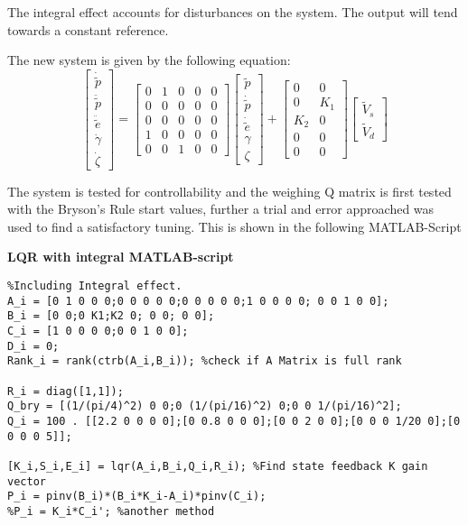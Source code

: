 The integral effect accounts for disturbances on the system. The output will tend towards a constant reference.

The new system is given by the following equation:
\begin{equation} \label{eq:LQR}
      \begin{bmatrix}
        \dot{\tilde{p}} \\
        \ddot{\tilde{p}} \\
        \ddot{\tilde{e}}\\
          \dot{\gamma} \\
        \dot{\zeta}
    \end{bmatrix}
    =
     \begin{bmatrix}
    0 & 1 & 0 & 0 & 0\\
    0 & 0 & 0 & 0 & 0 \\
    0 & 0 & 0 & 0 & 0 \\
    1 & 0 & 0 & 0 & 0 \\
    0 & 0 & 1 & 0 & 0
    \end{bmatrix}
    \begin{bmatrix}
        \tilde{p} \\
        \dot{\tilde{p}} \\
        \dot{\tilde{e}}\\
        \gamma\\
        \zeta
    \end{bmatrix}
    + %
       \begin{bmatrix}
    0 & 0 \\
    0 & K_1 \\
    K_2 & 0 \\
    0 & 0\\
    0 & 0
    \end{bmatrix}
    \begin{bmatrix}
        \tilde{V}_s \\
        \tilde{V}_d
    \end{bmatrix}     
\end{equation}


The system is tested for controllability and the weighing Q matrix is first tested with the Bryson's Rule start values, further a trial and error approached was used to find a satisfactory tuning. This is shown in the following MATLAB-Script


\textbf{LQR with integral    MATLAB-script}
\begin{lstlisting}
%Including Integral effect.
A_i = [0 1 0 0 0;0 0 0 0 0;0 0 0 0 0;1 0 0 0 0; 0 0 1 0 0];
B_i = [0 0;0 K1;K2 0; 0 0; 0 0];
C_i = [1 0 0 0 0;0 0 1 0 0];
D_i = 0;
Rank_i = rank(ctrb(A_i,B_i)); %check if A Matrix is full rank

R_i = diag([1,1]);
Q_bry = [(1/(pi/4)^2) 0 0;0 (1/(pi/16)^2) 0;0 0 1/(pi/16)^2];
Q_i = 100 . [[2.2 0 0 0 0];[0 0.8 0 0 0];[0 0 2 0 0];[0 0 0 1/20 0];[0 0 0 0 5]];

[K_i,S_i,E_i] = lqr(A_i,B_i,Q_i,R_i); %Find state feedback K gain vector
P_i = pinv(B_i)*(B_i*K_i-A_i)*pinv(C_i);
%P_i = K_i*C_i'; %another method 
\end{lstlisting}
      
